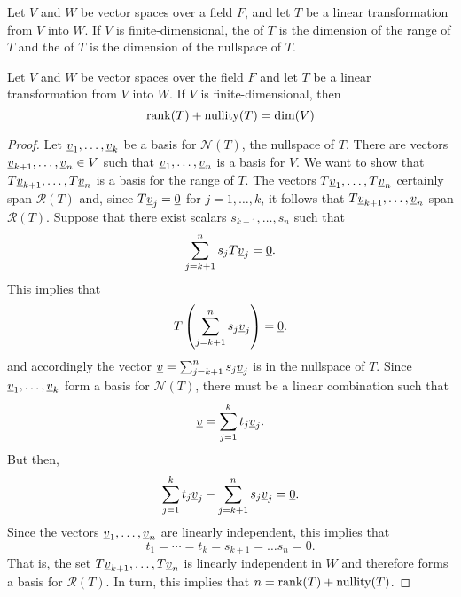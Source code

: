 \begin{definition}
Let $V$ and $W$ be vector spaces over a field $F$, and let $T$ be a linear transformation from $V$ into $W$.
If $V$ is finite-dimensional, the  of $T$ is the dimension of the range of $T$ and the  of $T$ is the dimension of the nullspace of $T$.
\end{definition}

\begin{theorem}
Let $V$ and $W$ be vector spaces over the field $F$ and let $T$ be a linear transformation from $V$ into $W$.
If $V$ is finite-dimensional, then
\begin{equation*}
\mathrm{rank} (T) + \mathrm{nullity} (T) = \dim (V)
\end{equation*}
\end{theorem}
\begin{proof}
Let $\underline{v}_1, \ldots, \underline{v}_k$ be a basis for $\mathcal{N}(T)$, the nullspace of $T$.
There are vectors $\underline{v}_{k+1}, \ldots, \underline{v}_n \in V$ such that $\underline{v}_1, \ldots, \underline{v}_n$ is a basis for $V$.
We want to show that $T \underline{v}_{k+1}, \ldots, T \underline{v}_n$ is a basis for the range of $T$.
The vectors $T \underline{v}_1, \ldots, T \underline{v}_n$ certainly span $\mathcal{R}(T)$ and, since $T \underline{v}_j = \underline{0}$ for $j = 1, \ldots, k$, it follows that $T \underline{v}_{k+1}, \ldots, \underline{v}_n$ span $\mathcal{R}(T)$.
Suppose that there exist scalars $s_{k+1}, \ldots, s_n$ such that
\begin{equation*}
\sum_{j=k+1}^n s_j T \underline{v}_j = \underline{0}.
\end{equation*}
This implies that
\begin{equation*}
T \left( \sum_{j=k+1}^n s_j \underline{v}_j \right) = \underline{0}.
\end{equation*}
and accordingly the vector $\underline{v} = \sum_{j=k+1}^n s_j \underline{v}_j$ is in the nullspace of $T$.
Since $\underline{v}_1, \ldots, \underline{v}_k$ form a basis for $\mathcal{N}(T)$, there must be a linear combination such that
\begin{equation*}
\underline{v} = \sum_{j=1}^k t_j \underline{v}_j .
\end{equation*}
But then,
\begin{equation*}
\sum_{j=1}^k t_j \underline{v}_j - \sum_{j=k+1}^n s_j \underline{v}_j = \underline{0}.
\end{equation*}
Since the vectors $\underline{v}_1, \ldots, \underline{v}_n$ are linearly independent, this implies that
\begin{equation*}
t_1 = \cdots = t_k = s_{k+1} = \hdots s_n = 0.
\end{equation*}
That is, the set $T \underline{v}_{k+1}, \ldots, T \underline{v}_n$ is linearly independent in $W$ and therefore forms a basis for $\mathcal{R}(T)$.
In turn, this implies that $n = \mathrm{rank}(T) + \mathrm{nullity}(T)$.
\end{proof}

